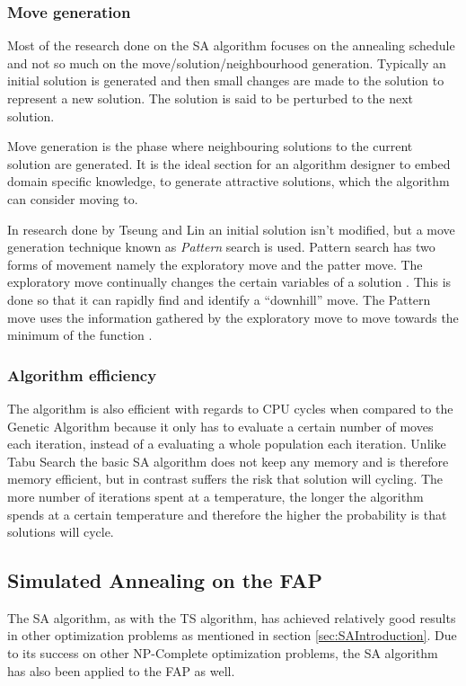 \subsubsection{Move generation}
Most of the research done on the SA algorithm focuses on the annealing schedule and not so much on the move/solution/neighbourhood generation. Typically an initial solution is generated and then small changes are made to the solution to represent a new solution. The solution is said to be perturbed to the next solution.

Move generation is the phase where neighbouring solutions to the current solution are generated. It is the ideal section for an algorithm designer to embed domain specific knowledge, to generate attractive solutions, which the algorithm can consider moving to.

In research done by Tseung and Lin \cite{CurveFittingSA} an initial solution isn't modified, but a move generation technique known as \emph{Pattern} search is used. Pattern search has two forms of movement namely the exploratory move and the patter move. The exploratory move continually changes the certain variables of a solution \cite{CurveFittingSA}. This is done so that it can rapidly find and identify a ``downhill'' move. The Pattern move uses the information gathered by the exploratory move to move towards the minimum of the function \cite{CurveFittingSA}.
\subsubsection{Algorithm efficiency}
The algorithm is also efficient with regards to CPU cycles when compared to the Genetic Algorithm because it only has to evaluate a certain number of moves each iteration, instead of a evaluating a whole population each iteration. Unlike Tabu Search the basic SA algorithm does not keep any memory and is therefore memory efficient, but in contrast suffers the risk that solution will cycling. The more number of iterations spent at a temperature, the longer the algorithm spends at a certain temperature and therefore the higher the probability is that solutions will cycle.
\subsection{Simulated Annealing on the FAP}
The SA algorithm, as with the TS algorithm, has achieved relatively good results in other optimization problems as mentioned in section \ref{sec:SAIntroduction}. Due to its success on other NP-Complete optimization problems, the SA algorithm has also been applied to the FAP as well.

